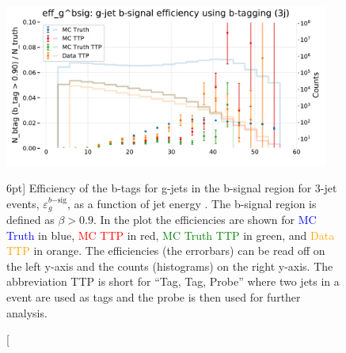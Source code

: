 \documentclass[a4paper, twoside, nobib]{tufte-book}
\newcommand{\code}[1]{\colorbox{light-gray}{\texttt{\detokenize{#1}}}}
\newcommand{\q}[1]{``#1''}
\begin{document}
\begin{figure}
  \includegraphics[width=0.95\textwidth, trim=0 0 0 30, clip]{figures/quarks/eff_g_bsig-down_sample=1.00-ML_vars=vertex-selection=b-ejet_min=4-n_iter_RS_lgb=99-n_iter_RS_xgb=9-cdot_cut=0.90-version=19.pdf}
  \caption[b-Tagging Efficiency $\varepsilon_g^{b\mathrm{-sig}}$ as a function of jet energy][6pt]
          {Efficiency of the b-tags for g-jets in the b-signal region for 3-jet events, $\varepsilon_g^{b\mathrm{-sig}}$, as a function of jet energy \code{Ejet}. The b-signal region is defined as $\beta > 0.9$. In the plot the efficiencies are shown for \textcolor{blue}{MC Truth} in blue, \textcolor{red}{MC TTP} in red, \textcolor{green}{MC Truth TTP} in green, and \textcolor{orange}{Data TTP} in orange. The efficiencies (the errorbars) can be read off on the left y-axis and the counts (histograms) on the right y-axis. The abbreviation TTP is short for \q{Tag, Tag, Probe} where two jets in a event are used as tags and the probe is then used for further analysis.  
          } 
  \label{fig:q:effiency_btag_gjet_bsig}
\end{figure}
\end{document}
